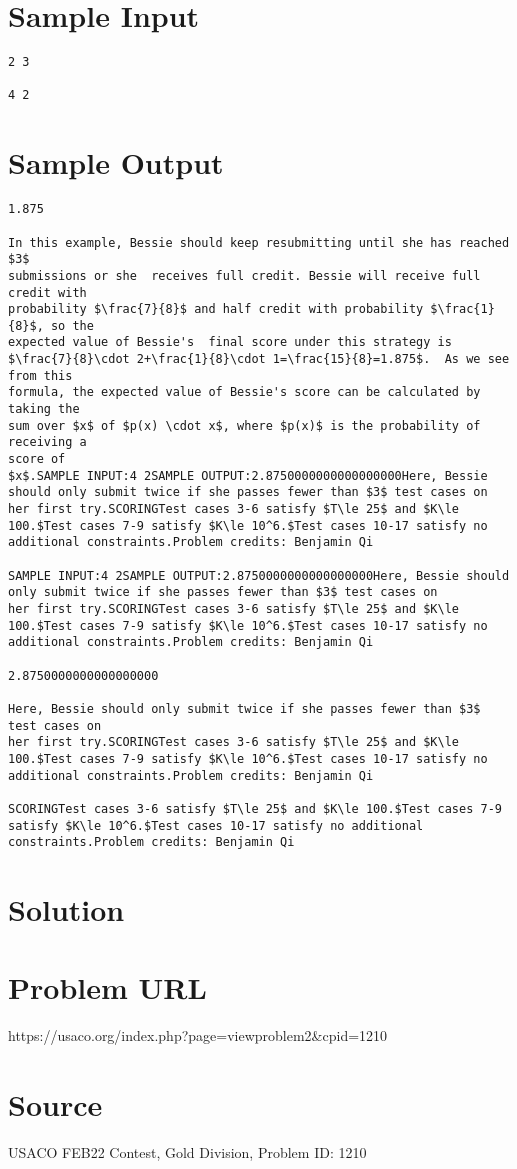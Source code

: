 \documentclass[12pt]{article}
\begin{document}
\section*{Sample Input}
\begin{verbatim}
2 3

4 2
\end{verbatim}

\section*{Sample Output}
\begin{verbatim}
1.875

In this example, Bessie should keep resubmitting until she has reached $3$
submissions or she  receives full credit. Bessie will receive full credit with
probability $\frac{7}{8}$ and half credit with probability $\frac{1}{8}$, so the
expected value of Bessie's  final score under this strategy is
$\frac{7}{8}\cdot 2+\frac{1}{8}\cdot 1=\frac{15}{8}=1.875$.  As we see from this
formula, the expected value of Bessie's score can be calculated by  taking the
sum over $x$ of $p(x) \cdot x$, where $p(x)$ is the probability of receiving a
score of
$x$.SAMPLE INPUT:4 2SAMPLE OUTPUT:2.8750000000000000000Here, Bessie should only submit twice if she passes fewer than $3$ test cases on
her first try.SCORINGTest cases 3-6 satisfy $T\le 25$ and $K\le 100.$Test cases 7-9 satisfy $K\le 10^6.$Test cases 10-17 satisfy no additional constraints.Problem credits: Benjamin Qi

SAMPLE INPUT:4 2SAMPLE OUTPUT:2.8750000000000000000Here, Bessie should only submit twice if she passes fewer than $3$ test cases on
her first try.SCORINGTest cases 3-6 satisfy $T\le 25$ and $K\le 100.$Test cases 7-9 satisfy $K\le 10^6.$Test cases 10-17 satisfy no additional constraints.Problem credits: Benjamin Qi

2.8750000000000000000

Here, Bessie should only submit twice if she passes fewer than $3$ test cases on
her first try.SCORINGTest cases 3-6 satisfy $T\le 25$ and $K\le 100.$Test cases 7-9 satisfy $K\le 10^6.$Test cases 10-17 satisfy no additional constraints.Problem credits: Benjamin Qi

SCORINGTest cases 3-6 satisfy $T\le 25$ and $K\le 100.$Test cases 7-9 satisfy $K\le 10^6.$Test cases 10-17 satisfy no additional constraints.Problem credits: Benjamin Qi
\end{verbatim}

\section*{Solution}


\section*{Problem URL}
https://usaco.org/index.php?page=viewproblem2&cpid=1210

\section*{Source}
USACO FEB22 Contest, Gold Division, Problem ID: 1210
\end{document}
